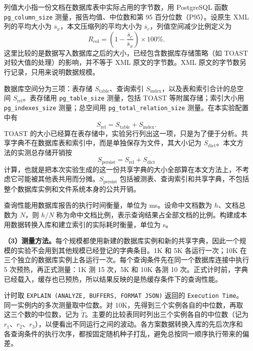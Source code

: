 列值大小指一份文档在数据库表中实际占用的字节数，用 PostgreSQL 函数 \nolinkurl{pg_column_size} 测量，报告均值、中位数和第 95 百分位数（P95）。设原生 XML 列的平均大小为 $\overline{s}_{x}$，本文压缩列的平均大小为 $\overline{s}_{c}$，列值空间减少比例定义为
\begin{equation}
R_{\mathrm{col}}=\left(1-\frac{\overline{s}_{c}}{\overline{s}_{x}}\right)\times100\%.
\label{eq:exp-column-reduction}
\end{equation}
这里比较的是数据写入数据库之后的大小，已经包含数据库存储策略（如 TOAST 对较大值的处理）的影响，并不等于 XML 原文的字节数。XML 原文的字节数另行记录，只用来说明数据规模。

数据库空间分为三项：表存储 $S_{\mathrm{table}}$、查询索引 $S_{\mathrm{index}}$，以及表和索引合计的总空间 $S_{\mathrm{rel}}$。表存储用 \texttt{pg\_table\_size} 测量，包括 TOAST 等附属存储；索引大小用 \texttt{pg\_indexes\_size} 测量；总空间用 \texttt{pg\_total\_relation\_size} 测量。在本实验配置中有
\begin{equation}
S_{\mathrm{rel}}=S_{\mathrm{table}}+S_{\mathrm{index}}.
\end{equation}
TOAST 的大小已经算在表存储中，实验另行列出这一项，只是为了便于分析。共享字典不在数据库表和索引中，而是单独保存为文件，其大小记为 $S_{\mathrm{dict}}$。本文方法的实测总存储开销按
\begin{equation}
S_{\mathrm{persist}}=S_{\mathrm{rel}}+S_{\mathrm{dict}}
\label{eq:exp-persistent-cost}
\end{equation}
计算，也就是把本次实验生成的这一份共享字典的大小全部算在本文方法上，不考虑它可能被其他表共用而分摊。$S_{\mathrm{persist}}$ 包括被测表、查询索引和共享字典，不包括整个数据库实例和文件系统本身的公共开销。

查询性能用数据库报告的执行时间衡量，单位为 ms。设命中文档数为 $h$、文档总数为 $N$，则 $h/N$ 称为命中文档比例，表示查询结果占全部文档的比例。构建成本用数据转换入库和建立索引的实际耗时衡量，单位为 s。

\textbf{（3）测量方法。}每个规模都使用新建的数据库实例和新的共享字典，因此一个规模的实验不会用到其他规模已经登记的字典条目。1K 和 5K 各运行一次；10K 在三个独立的数据库实例上各运行一次。每个查询条件先在同一个数据库连接中执行 5 次预热，再正式测量：1K 测 15 次，5K 和 10K 各测 10 次。正式计时前，字典已经载入，缓存也已预热，所以结果反映的是热缓存条件下的查询性能。

计时取 \texttt{EXPLAIN (ANALYZE, BUFFERS, FORMAT JSON)} 返回的 \texttt{Execution Time}。同一实例内的多次测量取中位数。对 10K，先得到三个实例各自的中位数，再取这三个数的中位数，记为 $\widetilde{T}$。主要的比较表同时列出三个实例各自的中位数（记为 $r_1$、$r_2$、$r_3$），以便看出不同运行之间的波动。各方案数据转换入库的先后次序和各查询条件的执行次序，都按固定随机种子打乱，避免总按同一顺序执行带来的偏差。

